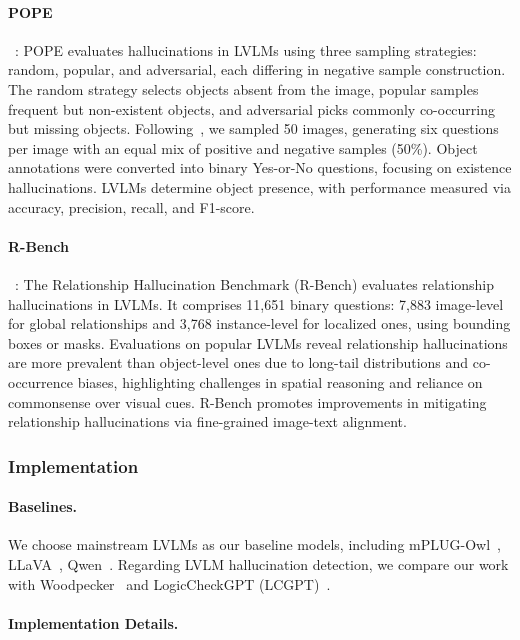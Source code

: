 \paragraph{POPE}~\cite{Li-hallucination-2023}: POPE evaluates hallucinations in LVLMs using three sampling strategies: random, popular, and adversarial, each differing in negative sample construction. The random strategy selects objects absent from the image, popular samples frequent but non-existent objects, and adversarial picks commonly co-occurring but missing objects. Following~\cite{li2023evaluating}, we sampled 50 images, generating six questions per image with an equal mix of positive and negative samples (50\%). Object annotations were converted into binary Yes-or-No questions, focusing on existence hallucinations. LVLMs determine object presence, with performance measured via accuracy, precision, recall, and F1-score.

\paragraph{R-Bench}~\cite{pmlr-v235-wu24l}: The Relationship Hallucination Benchmark (R-Bench) evaluates relationship hallucinations in LVLMs. It comprises 11,651 binary questions: 7,883 image-level for global relationships and 3,768 instance-level for localized ones, using bounding boxes or masks. Evaluations on popular LVLMs reveal relationship hallucinations are more prevalent than object-level ones due to long-tail distributions and co-occurrence biases, highlighting challenges in spatial reasoning and reliance on commonsense over visual cues. R-Bench promotes improvements in mitigating relationship hallucinations via fine-grained image-text alignment.

\subsubsection{Implementation}

\paragraph{Baselines.}

We choose mainstream LVLMs as our baseline models, including mPLUG-Owl~\cite{ye2023mplug}, LLaVA~\cite{liu2023visual}, Qwen~\cite{Qwen-VL}. Regarding LVLM hallucination detection, we compare our work with Woodpecker~\cite{yin2023woodpecker} and LogicCheckGPT (LCGPT)~\cite{wu2024logical}.

\paragraph{Implementation Details.}

